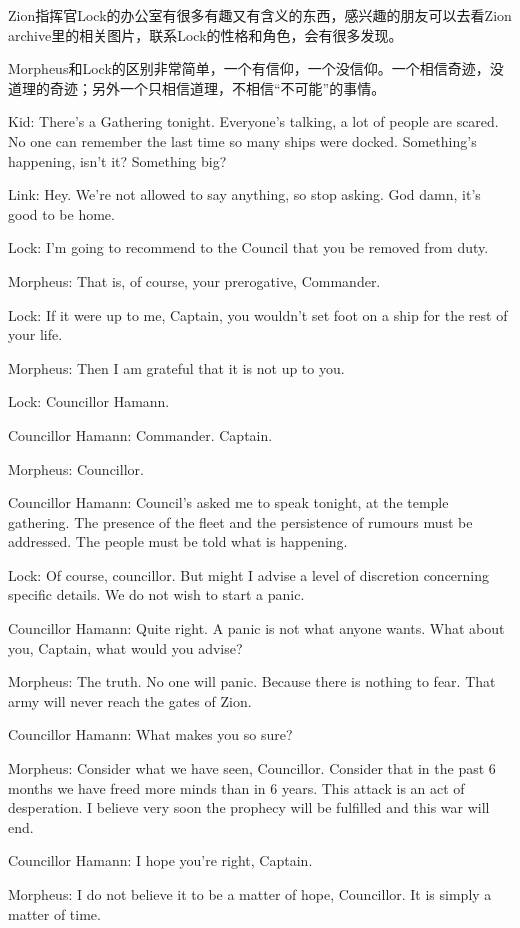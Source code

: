 \documentclass{ctexart}
\newenvironment{myquote}{\color{green} \setlength{\leftskip}{6em} \setlength{\rightskip}{4em} \setlength{\parindent}{-2em}}{\par}
\begin{document}
Zion指挥官Lock的办公室有很多有趣又有含义的东西，感兴趣的朋友可以去看Zion archive里的相关图片，联系Lock的性格和角色，会有很多发现。

Morpheus和Lock的区别非常简单，一个有信仰，一个没信仰。一个相信奇迹，没道理的奇迹；另外一个只相信道理，不相信“不可能”的事情。

\begin{myquote}
Kid: There's a Gathering tonight. Everyone's talking, a lot of people are scared. No one can remember the last time so many ships were docked. Something's happening, isn't it? Something big?

Link: Hey. We're not allowed to say anything, so stop asking. God damn, it's good to be home.

Lock: I'm going to recommend to the Council that you be removed from duty.

Morpheus: That is, of course, your prerogative, Commander.

Lock: If it were up to me, Captain, you wouldn't set foot on a ship for the rest of your life.

Morpheus: Then I am grateful that it is not up to you.

Lock: Councillor Hamann.

Councillor Hamann: Commander. Captain.

Morpheus: Councillor.

Councillor Hamann: Council's asked me to speak tonight, at the temple gathering. The presence of the fleet and the persistence of rumours must be addressed. The people must be told what is happening.

Lock: Of course, councillor. But might I advise a level of discretion concerning specific details. We do not wish to start a panic.

Councillor Hamann: Quite right. A panic is not what anyone wants. What about you, Captain, what would you advise?

Morpheus: The truth. No one will panic. Because there is nothing to fear. That army will never reach the gates of Zion.

Councillor Hamann: What makes you so sure?

Morpheus: Consider what we have seen, Councillor. Consider that in the past 6 months we have freed more minds than in 6 years. This attack is an act of desperation. I believe very soon the prophecy will be fulfilled and this war will end.

Councillor Hamann: I hope you're right, Captain.

Morpheus: I do not believe it to be a matter of hope, Councillor. It is simply a matter of time.
\end{myquote}
\end{document}
